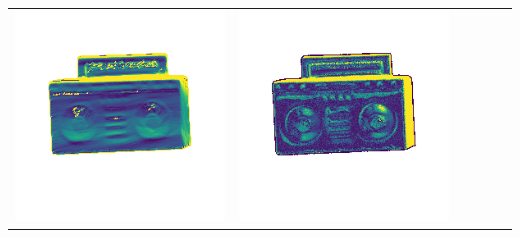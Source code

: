 \begin{center}
\begin{tabularx}{\linewidth}{@{}Y@{}Y@{}Y@{}Y@{}Y@{}Y@{}}
\includegraphics[width=\linewidth]{semisynthetic/20150514_19_yu_err.png} &
\includegraphics[width=\linewidth]{semisynthetic/20150514_19_dpsn_err.png} &

\end{tabularx}
\end{center}
